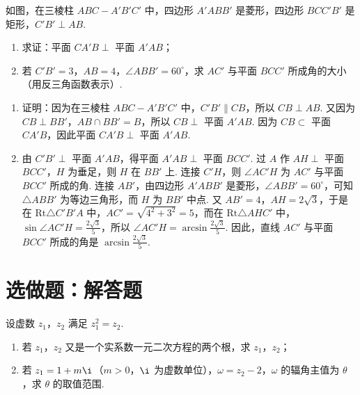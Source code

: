 \documentclass[UTF8,a4paper,oneside,11pt]{ctexbook}
\begin{document}
\begin{problem}
如图，在三棱柱 \(ABC-A'B'C'\) 中，四边形 \(A'ABB'\) 是菱形，四边形 \(BCC'B'\) 是矩形，\(C'B' \perp AB\).
\begin{enumerate}
\item 求证：平面 \(CA'B \perp\) 平面 \(A'AB\)；
\item 若 \(C'B'=3\)，\(AB=4\)，\(\angle ABB'=60^\circ\)，求 \(AC'\) 与平面 \(BCC'\) 所成角的大小（用反三角函数表示）.
\end{enumerate}

\end{problem}

\begin{solution}

\begin{enumerate}
\item 证明：因为在三棱柱 \(ABC-A'B'C'\) 中，\(C'B' \parallel CB\)，所以 \(CB \perp AB\). 又因为 \(CB \perp BB'\)，\(AB \cap BB'=B\)，所以 \(CB \perp\) 平面 \(A'AB\). 因为 \(CB \subset\) 平面 \(CA'B\)，因此平面 \(CA'B \perp\) 平面 \(A'AB\).

\item 由 \(C'B' \perp\) 平面 \(A'AB\)，得平面 \(A'AB \perp\) 平面 \(BCC'\). 过 \(A\) 作 \(AH \perp\) 平面 \(BCC'\)，\(H\) 为垂足，则 \(H\) 在 \(BB'\) 上. 连接 \(C'H\)，则 \(\angle AC'H\) 为 \(AC'\) 与平面 \(BCC'\) 所成的角. 连接 \(AB'\)，由四边形 \(A'ABB'\) 是菱形，\(\angle ABB'=60^\circ\)，可知 \(\triangle ABB'\) 为等边三角形，而 \(H\) 为 \(BB'\) 中点. 又 \(AB'=4\)，\(AH=2\sqrt{3}\)，于是在 \(\mathrm{Rt}\triangle C'B'A\) 中，\(AC'=\sqrt{4^2+3^2}=5\)，而在 \(\mathrm{Rt}\triangle AHC'\) 中，\(\sin \angle AC'H=\frac{2\sqrt{3}}{5}\)，所以 \(\angle AC'H=\arcsin \frac{2\sqrt{3}}{5}\). 因此，直线 \(AC'\) 与平面 \(BCC'\) 所成的角是 \(\arcsin \frac{2\sqrt{3}}{5}\).
\end{enumerate}
\end{solution}


\section{选做题：解答题}

\begin{problem}[A]
设虚数 \(z_1\)，\(z_2\) 满足 \(z_1^2=z_2\).
\begin{enumerate}
\item 若 \(z_1\)，\(z_2\) 又是一个实系数一元二次方程的两个根，求 \(z_1\)，\(z_2\)；
\item 若 \(z_1=1+m\i\)（\(m>0\)，\(\i\) 为虚数单位），\(\omega=z_2-2\)，\(\omega\) 的辐角主值为 \(\theta\)，求 \(\theta\) 的取值范围.
\end{enumerate}
\end{problem}
\end{document}

